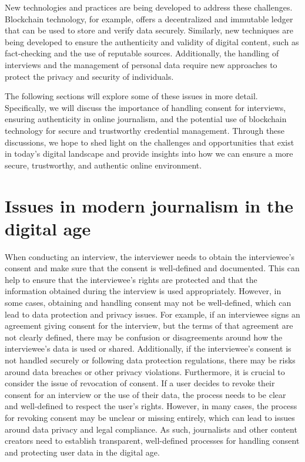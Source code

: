 \documentclass[target=mst,aauheader=]{thud}
\begin{document}
New technologies and practices are being developed to address these challenges. Blockchain technology, for example, offers a decentralized and immutable ledger that can be used to store and verify data securely. Similarly, new techniques are being developed to ensure the authenticity and validity of digital content, such as fact-checking and the use of reputable sources. Additionally, the handling of interviews and the management of personal data require new approaches to protect the privacy and security of individuals.

The following sections will explore some of these issues in more detail. Specifically, we will discuss the importance of handling consent for interviews, ensuring authenticity in online journalism, and the potential use of blockchain technology for secure and trustworthy credential management. Through these discussions, we hope to shed light on the challenges and opportunities that exist in today's digital landscape and provide insights into how we can ensure a more secure, trustworthy, and authentic online environment.

\section{Issues in modern journalism in the digital age}

When conducting an interview, the interviewer needs to obtain the interviewee's consent and make sure that the consent is well-defined and documented. This can help to ensure that the interviewee's rights are protected and that the information obtained during the interview is used appropriately. However, in some cases, obtaining and handling consent may not be well-defined, which can lead to data protection and privacy issues. For example, if an interviewee signs an agreement giving consent for the interview, but the terms of that agreement are not clearly defined, there may be confusion or disagreements around how the interviewee's data is used or shared. Additionally, if the interviewee's consent is not handled securely or following data protection regulations, there may be risks around data breaches or other privacy violations. Furthermore, it is crucial to consider the issue of revocation of consent.
If a user decides to revoke their consent for an interview or the use of their data, the process needs to be clear and well-defined to respect the user's rights. However, in many cases, the process for revoking consent may be unclear or missing entirely, which can lead to issues around data privacy and legal compliance. As such, journalists and other content creators need to establish transparent, well-defined processes for handling consent and protecting user data in the digital age.
\end{document}
